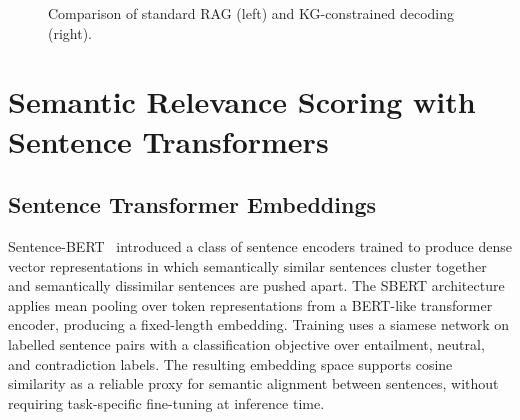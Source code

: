 \begin{figure}[H]
{
  }
  \caption[Standard RAG vs. KG-Constrained Decoding]{Comparison of standard RAG (left) and KG-constrained decoding (right).}\label{fig:rag_vs_constrained}
\end{figure}

\section{Semantic Relevance Scoring with Sentence Transformers}
\label{sec:sbert}

\subsection{Sentence Transformer Embeddings}

Sentence-BERT~\citep{reimers2019sbert} introduced a class of sentence encoders trained to produce dense vector representations in which semantically similar sentences cluster together and semantically dissimilar sentences are pushed apart. The SBERT architecture applies mean pooling over token representations from a BERT-like transformer encoder, producing a fixed-length embedding. Training uses a siamese network on labelled sentence pairs with a classification objective over entailment, neutral, and contradiction labels. The resulting embedding space supports cosine similarity as a reliable proxy for semantic alignment between sentences, without requiring task-specific fine-tuning at inference time.

